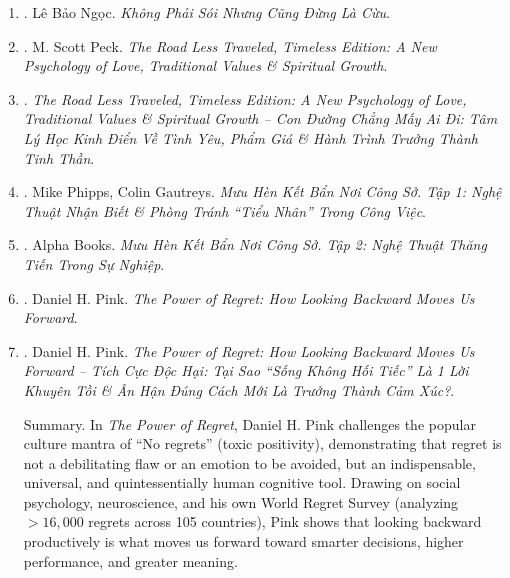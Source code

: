 \documentclass{article}
\begin{document}
\begin{enumerate}
	\item \cite{Ngoc_wolf_sheep}. {\sc Lê Bảo Ngọc}. {\it Không Phải Sói Nhưng Cũng Đừng Là Cừu}.\hfill{\sf[done]}

	\item \cite{Peck_road}. {\sc M. Scott Peck}. {\it The Road Less Traveled, Timeless Edition: A New Psychology of Love, Traditional Values \& Spiritual Growth}.

	\item \cite{Peck_road_VN}. {\it The Road Less Traveled, Timeless Edition: A New Psychology of Love, Traditional Values \& Spiritual Growth -- Con Đường Chẳng Mấy Ai Đi: Tâm Lý Học Kinh Điển Về Tình Yêu, Phẩm Giá \& Hành Trình Trưởng Thành Tinh Thần}.\hfill{\sf[done]}

	\item \cite{Phipps_Gautreys_muu_hen_ke_ban_tap_1}. Mike Phipps, Colin Gautreys. {\it Mưu Hèn Kết Bẩn Nơi Công Sở. Tập 1: Nghệ Thuật Nhận Biết \& Phòng Tránh ``Tiểu Nhân'' Trong Công Việc}.\hfill{\sf[done]}

	\item \cite{muu_hen_ke_ban_tap_2}. Alpha Books. {\it Mưu Hèn Kết Bẩn Nơi Công Sở. Tập 2: Nghệ Thuật Thăng Tiến Trong Sự Nghiệp}.\hfill{\sf[done]}

	\item \cite{Pink_power_regret}. {\sc Daniel H. Pink}. {\it The Power of Regret: How Looking Backward Moves Us Forward}. {}

	\item \cite{Pink_power_regret_VN}. {\sc Daniel H. Pink}. {\it The Power of Regret: How Looking Backward Moves Us Forward -- Tích Cực Độc Hại: Tại Sao ``Sống Không Hối Tiếc'' Là 1 Lời Khuyên Tồi \& Ân Hận Đúng Cách Mới Là Trưởng Thành Cảm Xúc?}.\hfill{\sf[done]}

	{\sf Summary.} In {\it The Power of Regret}, {\sc Daniel H. Pink} challenges the popular culture mantra of ``No regrets'' (toxic positivity), demonstrating that regret is not a debilitating flaw or an emotion to be avoided, but an indispensable, universal, and quintessentially human cognitive tool. Drawing on social psychology, neuroscience, and his own World Regret Survey (analyzing $> 16{,}000$ regrets across 105 countries), Pink shows that looking backward productively is what moves us forward toward smarter decisions, higher performance, and greater meaning.


\end{enumerate}
\end{document}
